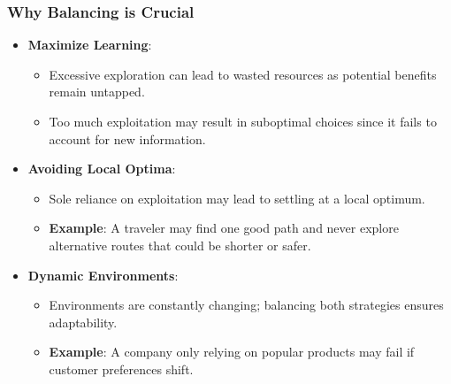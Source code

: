 \documentclass[aspectratio=169]{beamer}
\begin{document}
\begin{frame}[fragile]
    \frametitle{Why Balancing is Crucial}
    \begin{itemize}
        \item \textbf{Maximize Learning}:
        \begin{itemize}
            \item Excessive exploration can lead to wasted resources as potential benefits remain untapped.
            \item Too much exploitation may result in suboptimal choices since it fails to account for new information.
        \end{itemize}
        
        \item \textbf{Avoiding Local Optima}:
        \begin{itemize}
            \item Sole reliance on exploitation may lead to settling at a local optimum.
            \item \textbf{Example}: A traveler may find one good path and never explore alternative routes that could be shorter or safer.
        \end{itemize}

        \item \textbf{Dynamic Environments}:
        \begin{itemize}
            \item Environments are constantly changing; balancing both strategies ensures adaptability.
            \item \textbf{Example}: A company only relying on popular products may fail if customer preferences shift.
        \end{itemize}
    \end{itemize}
\end{frame}
\end{document}
